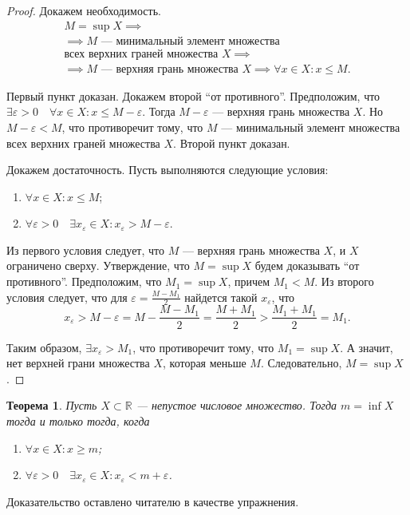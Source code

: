\documentclass[a4paper,12pt]{article} %
\newtheorem{theorem}{Теорема}[section]
\theoremstyle{remark}
\theoremstyle{definition}
\begin{document}
\begin{proof}
    Докажем необходимость. 
    \begin{multline}
        M = \sup X \implies \\
        \implies M \text{ --- минимальный элемент множества } \\
        \text{всех верхних граней множества } X \implies \\
        \implies M \text{ --- верхняя грань множества } X \implies \forall x\in X : x \le M.
    \end{multline}

    Первый пункт доказан. Докажем второй ``от противного''. Предположим, что $\exists \varepsilon>0 \quad 
    \forall x \in X : x \le M - \varepsilon$. Тогда $M - \varepsilon$ --- верхняя грань множества $X$.
    Но $M - \varepsilon < M$, что противоречит тому, что $M$ --- минимальный элемент множества всех верхних граней
    множества $X$. Второй пункт доказан.

    Докажем достаточность.
    Пусть выполняются следующие условия:
    \begin{enumerate}
        \item $\forall x \in X : x \le M$;
        \item $\forall \varepsilon>0 \quad \exists x_\varepsilon \in X: x_\varepsilon > M - \varepsilon$.
    \end{enumerate}

    Из первого условия следует, что $M$ --- верхняя грань множества $X$, и $X$ ограничено сверху.
    Утверждение, что $M=\sup X$ будем доказывать ``от противного''. Предположим, что $M_1 = \sup X$, причем $M_1 < M$.
    Из второго условия следует, что для $\varepsilon = \frac{M-M_1}{2}$ найдется такой $x_\varepsilon$,
    что
    \[x_\varepsilon > M - \varepsilon = M - \frac{M-M_1}{2} = \frac{M + M_1}{2} > \frac{M_1+M_1}{2} = M_1.\]

    Таким образом, $\exists x_\varepsilon > M_1$, что противоречит тому, что $M_1 = \sup X$. А значит, нет верхней грани множества $X$, которая меньше $M$. Следовательно, $M = \sup X$.
\end{proof}

\begin{theorem}
    Пусть $X \subset \mathbb{R}$ --- непустое числовое множество. Тогда $m = \inf X$ тогда и только тогда, когда
    \begin{enumerate}
        \item $\forall x \in X : x \ge m$;
        \item $\forall \varepsilon>0 \quad \exists x_\varepsilon \in X : x_\varepsilon < m + \varepsilon$.
    \end{enumerate}
\end{theorem}
    Доказательство оставлено читателю в качестве упражнения.
\end{document}
